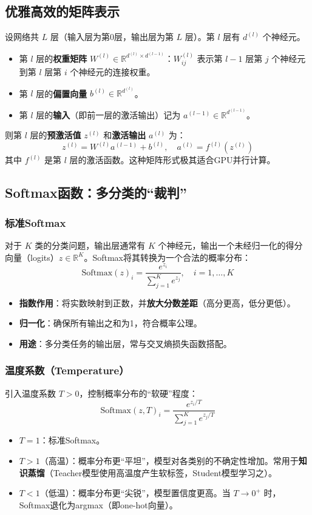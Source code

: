 \subsection{优雅高效的矩阵表示}
设网络共 $L$ 层（输入层为第0层，输出层为第 $L$ 层）。第 $l$ 层有 $d^{(l)}$ 个神经元。
\begin{itemize}
    \item 第 $l$ 层的\textbf{权重矩阵} $W^{(l)} \in \mathbb{R}^{d^{(l)} \times d^{(l-1)}}$：$W_{ij}^{(l)}$ 表示第 $l-1$ 层第 $j$ 个神经元到第 $l$ 层第 $i$ 个神经元的连接权重。
    \item 第 $l$ 层的\textbf{偏置向量} $b^{(l)} \in \mathbb{R}^{d^{(l)}}$。
    \item 第 $l$ 层的\textbf{输入}（即前一层的激活输出）记为 $a^{(l-1)} \in \mathbb{R}^{d^{(l-1)}}$。
\end{itemize}
则第 $l$ 层的\textbf{预激活值} $z^{(l)}$ 和\textbf{激活输出} $a^{(l)}$ 为：
\[
z^{(l)} = W^{(l)} a^{(l-1)} + b^{(l)}, \quad a^{(l)} = f^{(l)}(z^{(l)})
\]
其中 $f^{(l)}$ 是第 $l$ 层的激活函数。这种矩阵形式极其适合GPU并行计算。

\subsection{Softmax函数：多分类的“裁判”}

\subsubsection{标准Softmax}
对于 $K$ 类的分类问题，输出层通常有 $K$ 个神经元，输出一个未经归一化的得分向量（logits）$z \in \mathbb{R}^K$。Softmax将其转换为一个合法的概率分布：
\[
\text{Softmax}(z)_i = \frac{e^{z_i}}{\sum_{j=1}^{K} e^{z_j}}, \quad i=1,\ldots,K
\]
\begin{itemize}
    \item \textbf{指数作用}：将实数映射到正数，并\textbf{放大分数差距}（高分更高，低分更低）。
    \item \textbf{归一化}：确保所有输出之和为1，符合概率公理。
    \item \textbf{用途}：多分类任务的输出层，常与交叉熵损失函数搭配。
\end{itemize}

\subsubsection{温度系数（Temperature）}
引入温度系数 $T>0$，控制概率分布的“软硬”程度：
\[
\text{Softmax}(z, T)_i = \frac{e^{z_i / T}}{\sum_{j=1}^{K} e^{z_j / T}}
\]
\begin{itemize}
    \item $T=1$：标准Softmax。
    \item $T>1$（高温）：概率分布更“平坦”，模型对各类别的不确定性增加。常用于\textbf{知识蒸馏}（Teacher模型使用高温度产生软标签，Student模型学习之）。
    \item $T<1$（低温）：概率分布更“尖锐”，模型置信度更高。当 $T \to 0^+$ 时，Softmax退化为argmax（即one-hot向量）。
\end{itemize}

